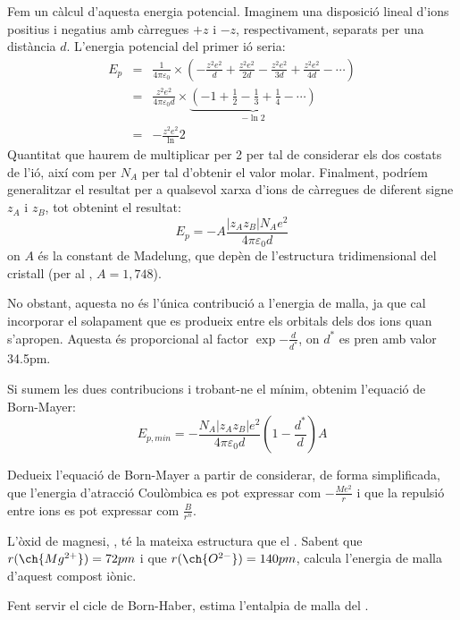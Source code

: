 Fem un càlcul d'aquesta energia potencial. Imaginem una disposició lineal d'ions positius i negatius amb càrregues $+z$ i $-z$, respectivament, separats per una distància $d$. L'energia potencial del primer ió seria:
\begin{eqnarray}
E_p&=&\frac{1}{4\pi \varepsilon_0} \times \left(
-\frac{z^2e^2}{d}+\frac{z^2e^2}{2d}-\frac{z^2e^2}{3d}+\frac{z^2e^2}{4d}-\cdots
\right)\\
&=&\frac{z^2e^2}{4\pi \varepsilon_0 d}\times \underbrace{(-1+\frac{1}{2}-\frac{1}{3}+\frac{1}{4}-\cdots)}_{-\ln 2}\\
&=&-\frac{z^2e^2} \ln 2
\end{eqnarray}
Quantitat que haurem de multiplicar per 2 per tal de considerar els dos costats de l'ió, així com per $N_A$ per tal d'obtenir el valor molar.
Finalment, podríem generalitzar el resultat per a qualsevol xarxa d'ions de càrregues de diferent signe $z_A$ i $z_B$, tot obtenint el resultat:
\[
E_p=-A\frac{|z_A z_B|N_A e^2}{4\pi \varepsilon_0 d}
\]
on $A$ és la constant de Madelung, que depèn de l'estructura tridimensional del cristall (per al , $A=1,748$).

No obstant, aquesta no és l'única contribució a l'energia de malla, ja que cal incorporar el solapament que es produeix entre els orbitals dels dos ions quan s'apropen. Aquesta és proporcional al factor $\exp{-\frac{d}{d^*}}$, on $d^*$ es pren amb valor 34.5pm.

Si sumem les dues contribucions i trobant-ne el mínim, obtenim l'equació de Born-Mayer:
\begin{equation}
E_{p,min}=-\frac{N_A|z_A z_B| e^2 }{4\pi \varepsilon_0 d}\left(1-\frac{d^*}{d}\right) A
\label{eq:BornMayer}
\end{equation}

\begin{exr}
Dedueix l'equació de Born-Mayer a partir de considerar, de forma simplificada, que l'energia d'atracció Coulòmbica es pot expressar com $-\frac{Me^2}{r}$ i que la repulsió entre ions es pot expressar com $\frac{B}{r^n}$.
\end{exr}
\begin{exr}
L'òxid de magnesi, , té la mateixa estructura que el . Sabent que $r(\ch{Mg^{2+}})=72pm$ i que $r(\ch{O^{2-}})=140pm$, calcula l'energia de malla d'aquest compost iònic.
\end{exr}

\begin{exr}
Fent servir el cicle de Born-Haber, estima l'entalpia de malla del .
\end{exr}

